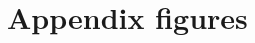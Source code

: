 \documentclass[12pt,letterpaper]{article}
\begin{document}
%
%  
%
%  

\appendix

\setcounter{figure}{0}
\setcounter{table}{0}
\renewcommand\thefigure{\Alph{section}.\arabic{figure}}
\renewcommand\thetable{\Alph{section}.\arabic{table}}
  
\section{Appendix figures}\label{sec:appendix_figure}
\end{document}
